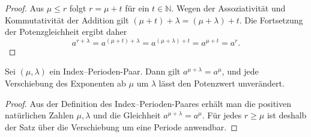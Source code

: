 \documentclass[main.tex]{subfiles}
\begin{document}
\begin{proof}
Aus \(\mu\leq r\) folgt \(r=\mu+t\) für ein \(t\in\mathbb N\).  Wegen
der Assoziativität und Kommutativität der Addition gilt
\((\mu+t)+\lambda=(\mu+\lambda)+t\).  Die Fortsetzung der
Potenzgleichheit ergibt daher
\[
  a^{r+\lambda}
  =a^{(\mu+t)+\lambda}
  =a^{(\mu+\lambda)+t}
  =a^{\mu+t}
  =a^r.
\]
\end{proof}

Sei \((\mu,\lambda)\) ein Index--Perioden-Paar.  Dann gilt
\(a^{\mu+\lambda}=a^\mu\), und jede Verschiebung des Exponenten ab \(\mu\)
um \(\lambda\) lässt den Potenzwert unverändert.

\begin{proof}
Aus der Definition des Index--Perioden-Paares erhält man die positiven
natürlichen Zahlen \(\mu,\lambda\) und die Gleichheit
\(a^{\mu+\lambda}=a^\mu\).  Für jedes \(r\geq\mu\) ist deshalb der Satz über
die Verschiebung um eine Periode anwendbar.
\end{proof}
\end{document}
